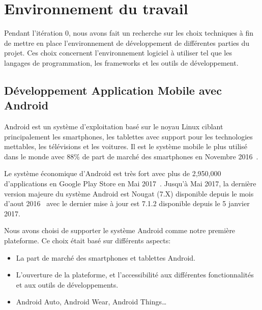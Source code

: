 \section{Environnement du travail}

Pendant l'itération 0, nous avons fait un recherche sur les choix techniques à
fin de mettre en place l'environnement de développement de différentes parties
du projet. Ces choix concernent l'environnement logiciel à utiliser tel que les
langages de programmation, les frameworks et les outils de développement.


\subsection{Développement Application Mobile avec Android}

Android est un système d'exploitation basé sur le noyau Linux ciblant
principalement les smartphones, les tablettes avec support pour les
technologies mettables, les télévisions et les voitures. Il est le système
mobile le plus utilisé dans le monde avec 88\% de part de marché des
smartphones en Novembre 2016~\cite{android-market-share}.

Le système économique d'Android est très fort avec plus de 2,950,000
d'applications en Google Play Store en Mai 2017~\cite{android-apps}. Jusqu'à
Mai 2017, la dernière version majeure du système Android est Nougat (7.X)
disponible depuis le mois d'aout 2016~\cite{android-7-release} avec le dernier
mise à jour est 7.1.2 disponible depuis le 5 janvier 2017.

Nous avons choisi de supporter le système Android comme notre première
plateforme. Ce choix était basé sur différents aspects:

\begin{itemize}
    \item La part de marché des smartphones et tablettes Android.
    \item L'ouverture de la plateforme, et l'accessibilité aux différentes
        fonctionnalités et aux outils de développements.
    \item Android Auto, Android Wear, Android Things\ldots
\end{itemize}

